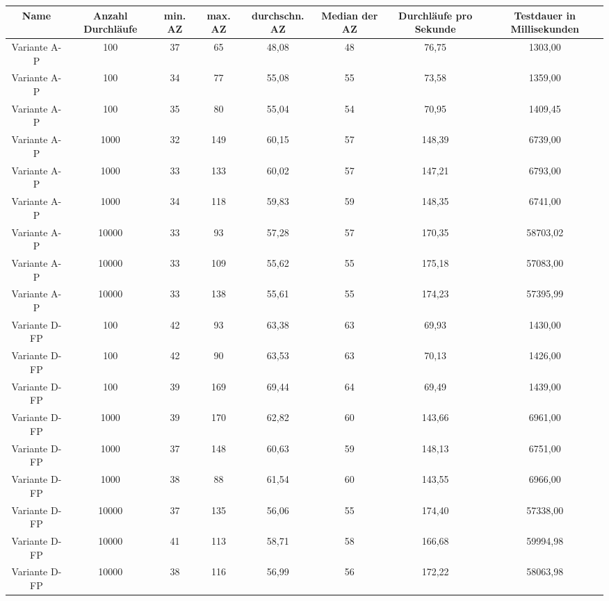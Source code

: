 \begin{anhang}
\begin{landscape}
	\begin{table}[h!]
		\centering
		\small
		\vspace{1cm}
		\begin{tabular}{ |c|c|c|c|c|c|c|c|} 
			\hline
			Name & Anzahl Durchläufe & min. AZ & max. AZ & durchschn. AZ & Median der AZ & Durchläufe pro Sekunde & Testdauer in Millisekunden \\ 
			\hline
			Variante A-P & 100 & 37 & 65 & 48,08 & 48 & 76,75 & 1303,00 \\
			\hline
			Variante A-P & 100 & 34 & 77 & 55,08 & 55 & 73,58 & 1359,00 \\
			\hline
			Variante A-P & 100 & 35 & 80 & 55,04 & 54 & 70,95 & 1409,45 \\
			\hline
			Variante A-P & 1000 & 32 & 149 & 60,15 & 57 & 148,39 & 6739,00 \\
			\hline
			Variante A-P & 1000 & 33 & 133 & 60,02 & 57 & 147,21 & 6793,00 \\
			\hline
			Variante A-P & 1000 & 34 & 118 & 59,83 & 59 & 148,35 & 6741,00 \\
			\hline
			Variante A-P & 10000 & 33 & 93 & 57,28 & 57 & 170,35 & 58703,02 \\
			\hline
			Variante A-P & 10000 & 33 & 109 & 55,62 & 55 & 175,18 & 57083,00 \\
			\hline
			Variante A-P & 10000 & 33 & 138 & 55,61 & 55 & 174,23 & 57395,99 \\
			\hline
			Variante D-FP & 100 & 42 & 93 & 63,38 & 63 & 69,93 & 1430,00 \\
			\hline
			Variante D-FP & 100 & 42 & 90 & 63,53 & 63 & 70,13 & 1426,00 \\
			\hline
			Variante D-FP & 100 & 39 & 169 & 69,44 & 64 & 69,49 & 1439,00 \\
			\hline
			Variante D-FP & 1000 & 39 & 170 & 62,82 & 60 & 143,66 & 6961,00 \\
			\hline
			Variante D-FP & 1000 & 37 & 148 & 60,63 & 59 & 148,13 & 6751,00 \\
			\hline
			Variante D-FP & 1000 & 38 & 88 & 61,54 & 60 & 143,55 & 6966,00 \\
			\hline
			Variante D-FP & 10000 & 37 & 135 & 56,06 & 55 & 174,40 & 57338,00 \\
			\hline
			Variante D-FP & 10000 & 41 & 113 & 58,71 & 58 & 166,68 & 59994,98 \\
			\hline
			Variante D-FP & 10000 & 38 & 116 & 56,99 & 56 & 172,22 & 58063,98 \\

\end{tabular}
\end{table}
\end{landscape}
\end{anhang}

